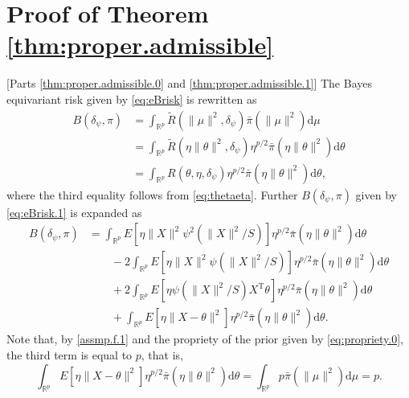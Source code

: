 \documentclass[preprint,11pt]{imsart}
\numberwithin{equation}{section}
\theoremstyle{plain}
\theoremstyle{definition}
\theoremstyle{remark}
\def\T{{ \mathrm{\scriptscriptstyle T} }}
\newcommand{\rd}{\mathrm{d}}
\begin{document}
\section{Proof of Theorem \ref{thm:proper.admissible}}
\label{sec:ap.proper.admissible}

[Parts \ref{thm:proper.admissible.0} and \ref{thm:proper.admissible.1}]\mbox{}
The Bayes equivariant risk given by \eqref{eq:eBrisk} is rewritten as
\begin{equation}\label{eq:eBrisk.1}
\begin{split}
B(\delta_\psi, \pi)&=\int_{\mathbb{R}^p} \tilde{R}(\|\mu\|^2,\delta_{\psi})\bar{\pi}(\|\mu\|^2) \rd \mu \\
 &=\int_{\mathbb{R}^p} \tilde{R}(\eta\|\theta\|^2,\delta_{\psi})\eta^{p/2}\bar{\pi}(\eta\|\theta\|^2) \rd \theta \\
 &=\int_{\mathbb{R}^p} R(\theta,\eta,\delta_{\psi})\eta^{p/2}\bar{\pi}(\eta\|\theta\|^2) \rd \theta,
\end{split}
\end{equation}
where the third equality follows from \eqref{eq:thetaeta}.
Further $B(\delta_\psi, \pi) $ given by \eqref{eq:eBrisk.1} is expanded as
\begin{equation}\label{eq:expand.Brisk}
 \begin{split}
 B(\delta_\psi, \pi)
 &=\int_{\mathbb{R}^p} E\left[\eta\|X\|^2\psi^2(\|X\|^2/S)\right]\eta^{p/2}\bar{\pi}(\eta\|\theta\|^2) \rd \theta \\
 &\qquad -2\int_{\mathbb{R}^p} E\left[\eta\|X\|^2\psi(\|X\|^2/S)\right]
 \eta^{p/2}\bar{\pi}(\eta\|\theta\|^2) \rd \theta \\
 &\qquad +2\int_{\mathbb{R}^p} E\left[\eta\psi(\|X\|^2/S)X^\T\theta\right]
 \eta^{p/2}\bar{\pi}(\eta\|\theta\|^2) \rd \theta \\
&\qquad + \int_{\mathbb{R}^p}E\left[\eta\|X-\theta\|^2\right]\eta^{p/2}\bar{\pi}(\eta\|\theta\|^2) \rd \theta. 
\end{split}
\end{equation}
Note that, by \eqref{assmp.f.1} and the propriety of the prior given by \eqref{eq:propriety.0},
the third term is equal to $p$, that is,
\begin{equation}\label{eq:equiv.third.term}
\int_{\mathbb{R}^p}E\left[\eta\|X-\theta\|^2\right]\eta^{p/2}\bar{\pi}(\eta\|\theta\|^2) \rd \theta 
=\int_{\mathbb{R}^p}p\bar{\pi}(\|\mu\|^2) \rd \mu   =p.
\end{equation}
\end{document}
